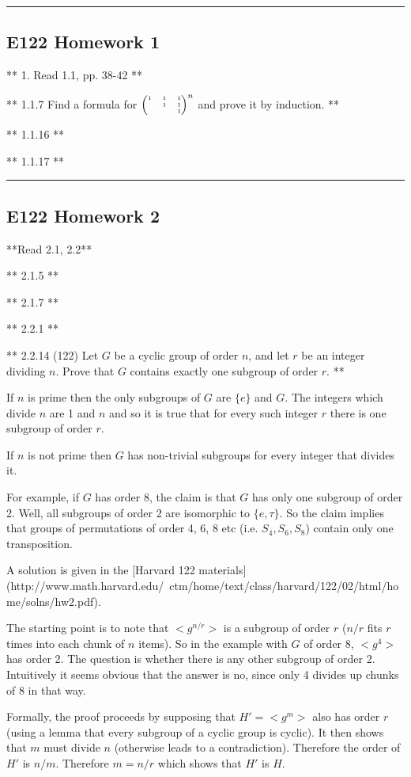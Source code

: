\hrule

\subsection{E122 Homework 1}

** 1. Read 1.1, pp. 38-42 **

** 1.1.7 Find a formula for $\tiny{\begin{pmatrix}1 & 1 & 1\\  & 1 & 1\\  &   & 1\\ \end{pmatrix}}^n$ and prove it by induction. **

** 1.1.16 **

** 1.1.17 **

\hrule
\subsection{E122 Homework 2}
**Read 2.1, 2.2**

** 2.1.5 **

** 2.1.7 **

** 2.2.1 **

** 2.2.14 (122) Let $G$ be a cyclic group of order $n$, and let $r$ be an integer
dividing $n$. Prove that $G$ contains exactly one subgroup of order $r$. **

If $n$ is prime then the only subgroups of $G$ are $\{e\}$ and $G$. The
integers which divide $n$ are 1 and $n$ and so it is true that for every such
integer $r$ there is one subgroup of order $r$.

If $n$ is not prime then $G$ has non-trivial subgroups for every integer that
divides it.

For example, if $G$ has order 8, the claim is that $G$ has only one subgroup of
order 2. Well, all subgroups of order 2 are isomorphic to $\{e, \tau\}$. So the
claim implies that groups of permutations of order 4, 6, 8 etc (i.e. $S_4, S_6,
S_8$) contain only one transposition.


A solution is given in the
[Harvard 122 materials](http://www.math.harvard.edu/~ctm/home/text/class/harvard/122/02/html/home/solns/hw2.pdf).

The starting point is to note that $<g^{n/r}>$ is a subgroup of order $r$
($n/r$ fits $r$ times into each chunk of $n$ items). So in the example with $G$
of order 8, $<g^{4}>$ has order 2. The question is whether there is any other
subgroup of order 2. Intuitively it seems obvious that the answer is no, since
only 4 divides up chunks of 8 in that way.

Formally, the proof proceeds by supposing that $H' = <g^m>$ also has order $r$
(using a lemma that every subgroup of a cyclic group is cyclic). It then shows
that $m$ must divide $n$ (otherwise leads to a contradiction). Therefore the
order of $H'$ is $n/m$. Therefore $m = n/r$ which shows that $H'$ is $H$.

